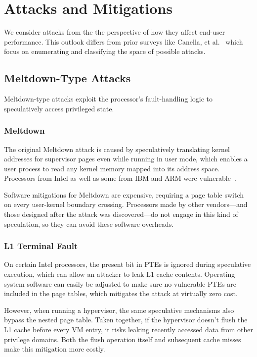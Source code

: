 \section{Attacks and Mitigations}
\label{s:background}

We consider attacks from the the perspective of how they affect end-user performance.
This outlook differs from prior surveys like Canella, et al.~\cite{sok:transient} which focus on enumerating and classifying the space of possible attacks.

\subsection{Meltdown-Type Attacks}

Meltdown-type attacks exploit the processor's fault-handling logic to speculatively access privileged state.

\subsubsection{Meltdown}
The original Meltdown attack is caused by speculatively translating kernel addresses for supervisor pages even while running in user mode, which enables a user process to read any kernel memory mapped into its address space.
Processors from Intel as well as some from IBM and ARM were vulnerable~\cite{intel:meltdown,ibm:speculation, arm:speculation}.

Software mitigations for Meltdown are expensive, requiring a page table
switch on every user-kernel boundary crossing.  Processors made by other
vendors---and those designed after the attack was discovered---do not engage in
this kind of speculation, so they can avoid these software overheads.

\subsubsection{L1 Terminal Fault}
On certain Intel processors, the present bit in PTEs is ignored during speculative execution, which can
allow an attacker to leak L1 cache contents.
Operating system software can easily be adjusted to make sure no vulnerable PTEs are included in the page tables, which mitigates the attack at virtually zero cost.

However, when running a hypervisor, the same speculative mechanisms also bypass
the nested page table.
Taken together, if the hypervisor doesn't flush the L1 cache before every VM entry, it risks leaking recently accessed data from other privilege domains.
Both the flush operation itself and subsequent cache misses make this mitigation more costly.

